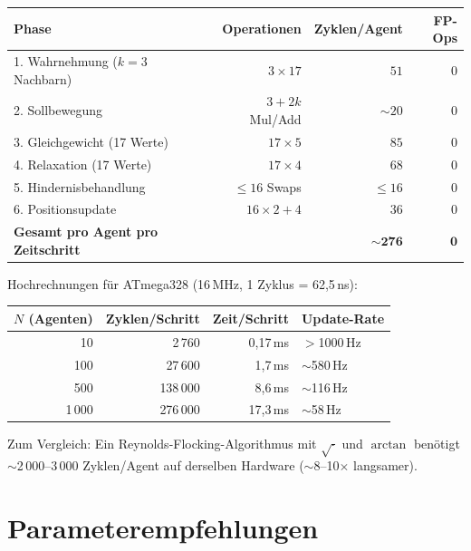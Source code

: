 \documentclass[11pt,a4paper]{article}
\begin{document}
\begin{center}
\begin{tabular}{@{}lrrr@{}}
\toprule
\textbf{Phase} & \textbf{Operationen} & \textbf{Zyklen/Agent} & \textbf{FP-Ops} \\
\midrule
1. Wahrnehmung ($k{=}3$ Nachbarn) & $3 \times 17$ & $51$ & 0 \\
2. Sollbewegung & $3 + 2k$ Mul/Add & $\sim 20$ & 0 \\
3. Gleichgewicht (17 Werte) & $17 \times 5$ & $85$ & 0 \\
4. Relaxation (17 Werte) & $17 \times 4$ & $68$ & 0 \\
5. Hindernisbehandlung & $\leq 16$ Swaps & $\leq 16$ & 0 \\
6. Positionsupdate & $16 \times 2 + 4$ & $36$ & 0 \\
\midrule
\textbf{Gesamt pro Agent pro Zeitschritt} & & $\mathbf{\sim 276}$ & $\mathbf{0}$ \\
\bottomrule
\end{tabular}
\end{center}

\noindent Hochrechnungen f\"ur ATmega328 (16\,MHz, 1 Zyklus = 62{,}5\,ns):

\begin{center}
\begin{tabular}{@{}rrrl@{}}
\toprule
$N$ (Agenten) & Zyklen/Schritt & Zeit/Schritt & Update-Rate \\
\midrule
10 & 2\,760 & 0{,}17\,ms & $>$1000\,Hz \\
100 & 27\,600 & 1{,}7\,ms & $\sim$580\,Hz \\
500 & 138\,000 & 8{,}6\,ms & $\sim$116\,Hz \\
1\,000 & 276\,000 & 17{,}3\,ms & $\sim$58\,Hz \\
\bottomrule
\end{tabular}
\end{center}

Zum Vergleich: Ein Reynolds-Flocking-Algorithmus mit $\sqrt{\cdot}$ und $\arctan$
ben\"otigt $\sim$2\,000--3\,000 Zyklen/Agent auf derselben Hardware ($\sim$8--10$\times$ langsamer).

\section{Parameterempfehlungen}
\end{document}
